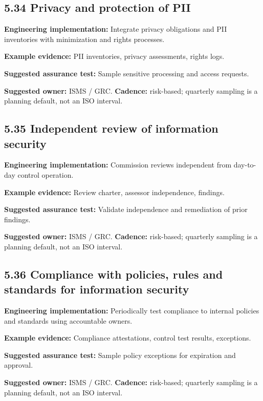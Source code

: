 \documentclass[11pt,letterpaper]{article}
\begin{document}
\subsection{5.34 Privacy and protection of PII}
\textbf{Engineering implementation:} Integrate privacy obligations and PII inventories with minimization and rights processes.\par
\textbf{Example evidence:} PII inventories, privacy assessments, rights logs.\par
\textbf{Suggested assurance test:} Sample sensitive processing and access requests.\par
\textbf{Suggested owner:} ISMS / GRC. \textbf{Cadence:} risk-based; quarterly sampling is a planning default, not an ISO interval.\par
{}
\subsection{5.35 Independent review of information security}
\textbf{Engineering implementation:} Commission reviews independent from day-to-day control operation.\par
\textbf{Example evidence:} Review charter, assessor independence, findings.\par
\textbf{Suggested assurance test:} Validate independence and remediation of prior findings.\par
\textbf{Suggested owner:} ISMS / GRC. \textbf{Cadence:} risk-based; quarterly sampling is a planning default, not an ISO interval.\par
{}
\subsection{5.36 Compliance with policies, rules and standards for information security}
\textbf{Engineering implementation:} Periodically test compliance to internal policies and standards using accountable owners.\par
\textbf{Example evidence:} Compliance attestations, control test results, exceptions.\par
\textbf{Suggested assurance test:} Sample policy exceptions for expiration and approval.\par
\textbf{Suggested owner:} ISMS / GRC. \textbf{Cadence:} risk-based; quarterly sampling is a planning default, not an ISO interval.\par
{}
\end{document}
